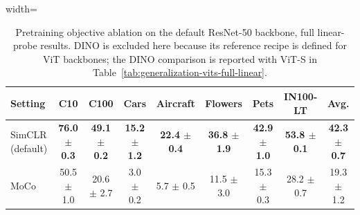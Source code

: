 \begin{table}[H]
\centering
\scriptsize
\setlength{\tabcolsep}{3.5pt}
\caption{Pretraining objective ablation on the default ResNet-50 backbone, full linear-probe results. DINO is excluded here because its reference recipe is defined for ViT backbones; the DINO comparison is reported with ViT-S in Table~\ref{tab:generalization-vits-full-linear}.}
\label{tab:app_pretraining_linear}
\begin{adjustbox}{width=\textwidth}
\begin{tabular}{l c c c c c c c c}
\toprule
Setting & C10 & C100 & Cars & Aircraft & Flowers & Pets & IN100-LT & Avg. \\
\midrule
SimCLR (default) & \textbf{76.0 {\scriptsize$\pm$ 0.3}} & \textbf{49.1 {\scriptsize$\pm$ 0.2}} & \textbf{15.2 {\scriptsize$\pm$ 1.2}} & \textbf{22.4 {\scriptsize$\pm$ 0.4}} & \textbf{36.8 {\scriptsize$\pm$ 1.9}} & \textbf{42.9 {\scriptsize$\pm$ 1.0}} & \textbf{53.8 {\scriptsize$\pm$ 0.1}} & \textbf{42.3 {\scriptsize$\pm$ 0.7}} \\
MoCo & 50.5 {\scriptsize$\pm$ 1.0} & 20.6 {\scriptsize$\pm$ 2.7} & 3.0 {\scriptsize$\pm$ 0.2} & 5.7 {\scriptsize$\pm$ 0.5} & 11.5 {\scriptsize$\pm$ 3.0} & 15.3 {\scriptsize$\pm$ 0.3} & 28.2 {\scriptsize$\pm$ 0.7} & 19.3 {\scriptsize$\pm$ 1.2} \\
\bottomrule
\end{tabular}
\end{adjustbox}
\end{table}
